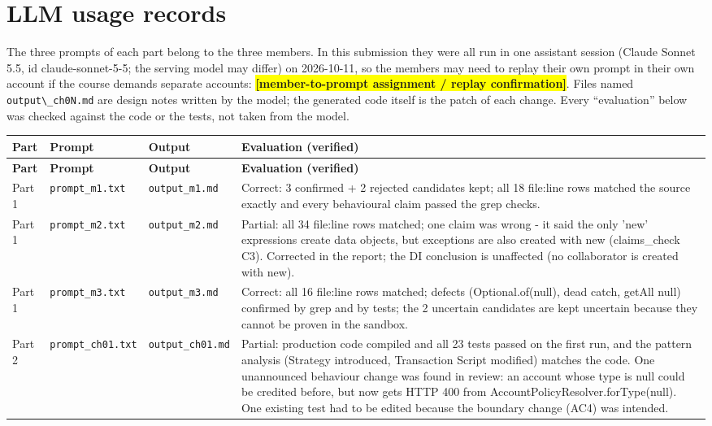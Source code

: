 \documentclass[11pt,a4paper]{article}
\newcommand{\ph}[1]{\colorbox{yellow}{\textbf{[#1]}}}
\begin{document}
\section{LLM usage records}
The three prompts of each part belong to the three members. In this submission they were all run in one assistant session (Claude Sonnet 5.5, id claude-sonnet-5-5; the serving model may differ) on 2026-10-11, so the members may need to replay their own prompt in their own account if the course demands separate accounts: \ph{member-to-prompt assignment / replay confirmation}. Files named \texttt{output\textbackslash{}\_\allowbreak{}ch0N.\allowbreak{}md} are design notes written by the model; the generated code itself is the patch of each change. Every ``evaluation'' below was checked against the code or the tests, not taken from the model.
{\footnotesize
\begin{longtable}{@{}p{1.1cm}p{3cm}p{3.3cm}p{8.3cm}@{}}
\toprule \textbf{Part} & \textbf{Prompt} & \textbf{Output} & \textbf{Evaluation (verified)} \\ \midrule \endfirsthead
\toprule \textbf{Part} & \textbf{Prompt} & \textbf{Output} & \textbf{Evaluation (verified)} \\ \midrule \endhead
\bottomrule \endfoot
Part 1 & \texttt{prompt\_\allowbreak{}m1.\allowbreak{}txt} & \texttt{output\_\allowbreak{}m1.\allowbreak{}md} & Correct: 3 confirmed + 2 rejected candidates kept; all 18 file:line rows matched the source exactly and every behavioural claim passed the grep checks. \\
Part 1 & \texttt{prompt\_\allowbreak{}m2.\allowbreak{}txt} & \texttt{output\_\allowbreak{}m2.\allowbreak{}md} & Partial: all 34 file:line rows matched; one claim was wrong - it said the only 'new' expressions create data objects, but exceptions are also created with new (claims\_check C3). Corrected in the report; the DI conclusion is unaffected (no collaborator is created with new). \\
Part 1 & \texttt{prompt\_\allowbreak{}m3.\allowbreak{}txt} & \texttt{output\_\allowbreak{}m3.\allowbreak{}md} & Correct: all 16 file:line rows matched; defects (Optional.of(null), dead catch, getAll null) confirmed by grep and by tests; the 2 uncertain candidates are kept uncertain because they cannot be proven in the sandbox. \\
Part 2 & \texttt{prompt\_\allowbreak{}ch01.\allowbreak{}txt} & \texttt{output\_\allowbreak{}ch01.\allowbreak{}md} & Partial: production code compiled and all 23 tests passed on the first run, and the pattern analysis (Strategy introduced, Transaction Script modified) matches the code. One unannounced behaviour change was found in review: an account whose type is null could be credited before, but now gets HTTP 400 from AccountPolicyResolver.forType(null). One existing test had to be edited because the boundary change (AC4) was intended. \\

\end{longtable}}
\end{document}

